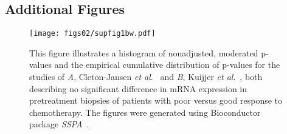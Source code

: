 
\begin{small}
\begin{singlespace}

\end{singlespace}
\end{small}

\begin{subappendices}
	\newpage
	\setcounter{figure}{0}
	\section{Additional Figures}
		\renewcommand{\figurename}{Additional Figure}
		\begin{figure}[h]
		  \centering
		    \texttt{[image: figs02/supfig1bw.pdf]}	%
		    \caption{This figure illustrates a histogram of nonadjusted, moderated p-values and the empirical
cumulative distribution of p-values for the studies of {\it A}, Cleton-Jansen {\it et al}.~\cite{cleton2009profiling} and {\it B}, Kuijjer {\it et al}.~\cite{kuijjer2011mrna}, both describing no significant difference in mRNA expression in pretreatment biopsies of patients with poor versus good response to chemotherapy. The figures were generated using Bioconductor package {\it SSPA}~\cite{van2009relative}.}
		     \label{afig2.1}
		\end{figure}
\end{subappendices}

%